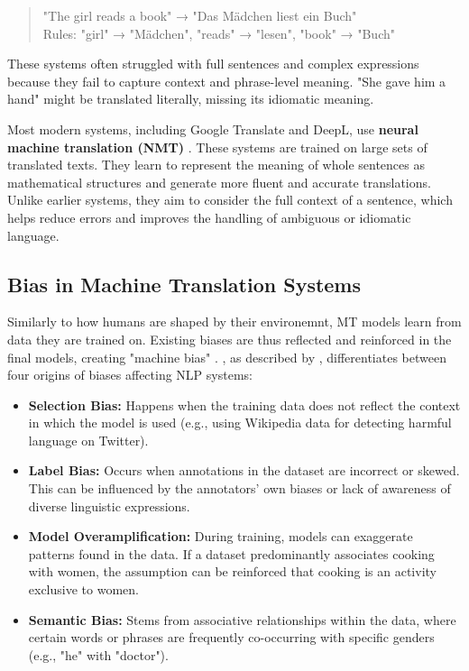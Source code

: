 \begin{quote}
"The girl reads a book" → "Das Mädchen liest ein Buch"\\[0.5em]
Rules: "girl" → "Mädchen", "reads" → "lesen", "book" → "Buch"
\end{quote}

\noindent These systems often struggled with full sentences and complex expressions because they fail to capture context and phrase-level meaning. "She gave him a hand" might be translated literally, missing its idiomatic meaning.

Most modern systems, including Google Translate and DeepL, use \textbf{neural machine translation (NMT)} \citep{wuGooglesNeuralMachine2016,deeplHowDoesDeepL2021}. These systems are trained on large sets of translated texts. They learn to represent the meaning of whole sentences as mathematical structures and generate more fluent and accurate translations. Unlike earlier systems, they aim to consider the full context of a sentence, which helps reduce errors and improves the handling of ambiguous or idiomatic language.

\subsection{Bias in Machine Translation Systems}

Similarly to how humans are shaped by their environemnt, MT models learn from data they are trained on. Existing biases are thus reflected and reinforced in the final models, creating "machine bias" \citep{stanczakSurveyGenderBias2021,smacchiaDoesAIReflect2024}. \citet{shahPredictiveBiasesNatural2020}, as described by \citet{ullmannGenderBiasMachine2022}, differentiates between four origins of biases affecting NLP systems:

\begin{itemize}
    \item \textbf{Selection Bias:} Happens when the training data does not reflect the context in which the model is used (e.g., using Wikipedia data for detecting harmful language on Twitter).
    
    \item \textbf{Label Bias:} Occurs when annotations in the dataset are incorrect or skewed. This can be influenced by the annotators' own biases or lack of awareness of diverse linguistic expressions.

    \item \textbf{Model Overamplification:} During training, models can exaggerate patterns found in the data. If a dataset predominantly associates cooking with women, the assumption can be reinforced that cooking is an activity exclusive to women.

    \item \textbf{Semantic Bias:} Stems from associative relationships within the data, where certain words or phrases are frequently co-occurring with specific genders (e.g., "he" with "doctor").
\end{itemize}

